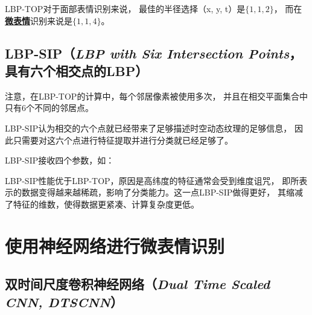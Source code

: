 \documentclass[AutoFakeBold]{MyFormat}
\begin{document}
\par LBP-TOP对于面部表情识别来说，
最佳的半径选择（x, y, t）是$\{1, 1, 2\}$，
而在\textbf{\Large \underline{微表情}}识别来说是$\{1, 1, 4\}$。

\section{LBP-SIP（\textit{LBP with Six Intersection Points}，
具有六个相交点的LBP）}

\par 注意，在LBP-TOP的计算中，每个邻居像素被使用多次，
并且在相交平面集合中只有6个不同的邻居点。

\par LBP-SIP认为相交的六个点就已经带来了足够描述时空动态纹理的足够信息，
因此只需要对这六个点进行特征提取并进行分类就已经足够了。

\par LBP-SIP接收四个参数，如：

\par LBP-SIP性能优于LBP-TOP，原因是高纬度的特征通常会受到维度诅咒，
即所表示的数据变得越来越稀疏，影响了分类能力。这一点LBP-SIP做得更好，
其缩减了特征的维数，使得数据更紧凑、计算复杂度更低。


\chapter{使用神经网络进行微表情识别}

\section{双时间尺度卷积神经网络（\textit{Dual Time Scaled CNN, DTSCNN}）}
\end{document}
